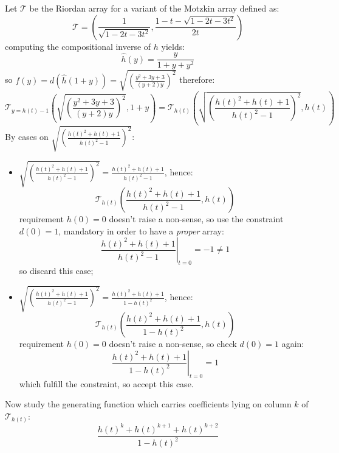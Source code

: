 Let $\mathcal{T}$ be the Riordan array for a variant
of the Motzkin array defined as:
\begin{displaymath} 
    \mathcal{T} = \left(\frac{1}{\sqrt{1-2t-3t^2}}, 
       \frac{1-t-\sqrt{1-2t-3t^2}}{2t}  \right)
\end{displaymath} 
computing the compositional inverse of $h$ yields:
\begin{displaymath} 
    \hat{h}(y) = \frac{y}{1+y+y^2}
\end{displaymath} 
so $f(y)=d(\hat{h}(1+y))=\sqrt{\left(\frac{y^2+3y+3}{(y+2)y}\right)^{2}}$ therefore:
\begin{displaymath} 
    \mathcal{T}_{y=h(t)-1}\left( \sqrt{\left(\frac{y^2+3y+3}{(y+2)y}\right)^{2}}, 1+y \right) = 
        \mathcal{T}_{h(t)}\left( \sqrt{\left(\frac{h(t)^2+h(t)+1}{h(t)^2-1}\right)^{2}}, h(t) \right) 
\end{displaymath} 
By cases on $\sqrt{\left(\frac{h(t)^2+h(t)+1}{h(t)^2-1}\right)^{2}}$:
\begin{itemize}
    \item $\sqrt{\left(\frac{h(t)^2+h(t)+1}{h(t)^2-1}\right)^{2}}=\frac{h(t)^2+h(t)+1}{h(t)^2-1}$, hence:
        \begin{displaymath} 
            \mathcal{T}_{h(t)}\left(\frac{h(t)^2+h(t)+1}{h(t)^2-1}, h(t) \right)
        \end{displaymath} 
        requirement $h(0)=0$ doesn't raise a non-sense, so use the 
        constraint $d(0)=1$, mandatory in order to have a \emph{proper} array:
        \begin{displaymath}
            \left. \frac{h(t)^2+h(t)+1}{h(t)^2-1} \right|_{t=0} = -1 \not= 1 
        \end{displaymath} 
        so discard this case;
    \item $\sqrt{\left(\frac{h(t)^2+h(t)+1}{h(t)^2-1}\right)^{2}}=\frac{h(t)^2+h(t)+1}{1-h(t)^2}$, hence:
        \begin{displaymath}
            \mathcal{T}_{h(t)}\left(\frac{h(t)^2+h(t)+1}{1-h(t)^2}, h(t) \right)
        \end{displaymath} 
        requirement $h(0)=0$ doesn't raise a non-sense, so check $d(0)=1$ again:
        \begin{displaymath}
            \left. \frac{h(t)^2+h(t)+1}{1-h(t)^2} \right|_{t=0} = 1 
        \end{displaymath} 
        which fulfill the constraint, so accept this case.
\end{itemize}
Now study the generating function which carries coefficients lying on column $k$
of $\mathcal{T}_{h(t)}$:
\begin{displaymath} 
    \frac{h(t)^{k}+h(t)^{k+1}+h(t)^{k+2}}{1-h(t)^2 }
\end{displaymath} 


